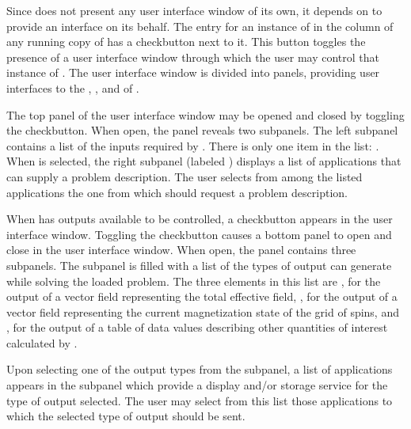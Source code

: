 Since  does not present
any user interface window of its own, it depends on
 to provide an interface on
its behalf.  The entry for an instance of  in the
 column of any running copy of
 has a checkbutton next to it.  This button toggles the
presence of a user interface window through which the user may control
that instance of .  The user interface window is divided
into panels, providing user interfaces to the
, , and  of .

The top panel of the user interface window may be opened and closed
by toggling the  checkbutton.  When open, the
 panel reveals two subpanels.  The left subpanel 
contains a list of the inputs required by .  There is
only one item in the list: .  When
 is selected, the right subpanel (labeled
) displays a list of applications
that can supply a problem description.  The user selects from among the
listed applications the one from which  should request a
problem description.

When  has outputs available to be controlled, a
 checkbutton appears in the user interface
window.  Toggling the  checkbutton causes a
bottom panel to open and close in the user interface window.  When open,
the  panel contains three subpanels.  The
 subpanel is filled with a list of the types of output
 can generate while solving the loaded problem.  The
three elements in this list are , for the output of a
vector field representing the total effective
field, , for the output of a vector field
representing the current magnetization state of the grid of spins, and
, for the output of a table of data
values describing other quantities of interest
calculated by .

Upon selecting one of the output types from the  subpanel,
a list of applications appears in the
 subpanel which provide a
display and/or storage service for the type of output selected.  The
user may select from this list those applications to which the selected
type of output should be sent.

